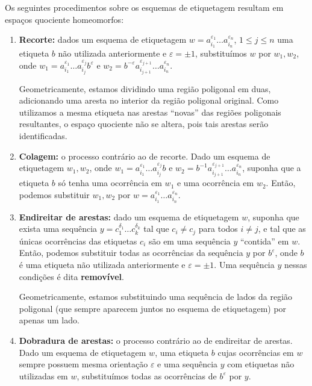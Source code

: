 \begin{prop}
    Os seguintes procedimentos sobre os esquemas de etiquetagem resultam em espaços quociente homeomorfos:
    \begin{enumerate}
        \item \textbf{Recorte:} dados um esquema de etiquetagem $w = a_{i_1}^{\varepsilon_1} \ldots a_{i_n}^{\varepsilon_n}$, $1\leq j\leq n$ uma etiqueta $b$ não utilizada anteriormente e $\varepsilon = \pm 1$, substituímos $w$ por $w_1, w_2$, onde $w_1 = a_{i_1}^{\varepsilon_1} \ldots a_{i_j}^{\varepsilon_j} b^{\varepsilon}$ e $w_2 = b^{-\varepsilon} a_{i_{j+1}}^{\varepsilon_{j+1}} \ldots a_{i_n}^{\varepsilon_n}$.
        
        Geometricamente, estamos dividindo uma região poligonal em duas, adicionando uma aresta no interior da região poligonal original. Como utilizamos a mesma etiqueta nas arestas ``novas'' das regiões poligonais resultantes, o espaço quociente não se altera, pois tais arestas serão identificadas.
    
        \item \textbf{Colagem:} o processo contrário ao de recorte. Dado um esquema de etiquetagem $w_1, w_2$, onde $w_1 = a_{i_1}^{\varepsilon_1} \ldots a_{i_j}^{\varepsilon_j} b$ e $w_2 = b^{-1} a_{i_{j+1}}^{\varepsilon_{j+1}} \ldots a_{i_n}^{\varepsilon_n}$, suponha que a etiqueta $b$ só tenha uma ocorrência em $w_1$ e uma ocorrência em $w_2$. Então, podemos substituir $w_1, w_2$ por $w = a_{i_1}^{\varepsilon_1} \ldots a_{i_n}^{\varepsilon_n}$.
    
        \item \textbf{Endireitar de arestas:} dado um esquema de etiquetagem $w$, suponha que exista uma sequência $y = c_1^{\delta_1} \ldots c_k^{\delta_k}$ tal que $c_i \neq c_j$ para todos $i\neq j$, e tal que as únicas ocorrências das etiquetas $c_i$ são em uma sequência $y$ ``contida'' em $w$. Então, podemos substituir todas as ocorrências da sequência $y$ por $b^{\varepsilon}$, onde $b$ é uma etiqueta não utilizada anteriormente e $\varepsilon = \pm 1$. Uma sequência $y$ nessas condições é dita \textbf{removível}.
    
        Geometricamente, estamos substituindo uma sequência de lados da região poligonal (que sempre aparecem juntos no esquema de etiquetagem) por apenas um lado.
    
        \item \textbf{Dobradura de arestas:} o processo contrário ao de endireitar de arestas. Dado um esquema de etiquetagem $w$, uma etiqueta $b$ cujas ocorrências em $w$ sempre possuem mesma orientação $\varepsilon$ e uma sequência $y$ com etiquetas não utilizadas em $w$, substituímos todas as ocorrências de $b^{\varepsilon}$ por $y$.


\end{enumerate}
\end{prop}

